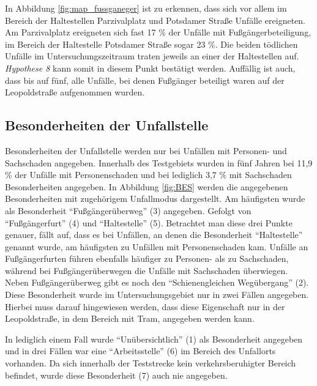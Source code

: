 In Abbildung \ref{fig:map_fussganeger} ist zu erkennen, dass sich vor allem im Bereich der Haltestellen Parzivalplatz und Potsdamer Straße Unfälle ereigneten. Am Parzivalplatz ereigneten sich fast 17 \% der Unfälle mit Fußgängerbeteiligung, im Bereich der Haltestelle Potsdamer Straße sogar 23 \%. Die beiden tödlichen Unfälle im Untersuchungszeitraum traten jeweils an einer der Haltestellen auf. \textit{Hypothese 8} kann somit in diesem Punkt bestätigt werden. Auffällig ist auch, dass bis auf fünf, alle Unfälle, bei denen Fußgänger beteiligt waren auf der Leopoldstraße aufgenommen wurden.

\subsection{Besonderheiten der Unfallstelle}
Besonderheiten der Unfallstelle werden nur bei Unfällen mit Personen- und Sachschaden angegeben. Innerhalb des Testgebiets wurden in fünf Jahren bei 11,9 \% der Unfälle mit Personenschaden und bei lediglich 3,7 \% mit Sachschaden Besonderheiten angegeben. In Abbildung \ref{fig:BES} werden die angegebenen Besonderheiten mit zugehörigem Unfallmodus dargestellt. Am häufigsten wurde als Besonderheit \enquote{Fußgängerüberweg} (3) angegeben. Gefolgt von \enquote{Fußgängerfurt} (4) und \enquote{Haltestelle} (5). Betrachtet man diese drei Punkte genauer, fällt auf, dass es bei Unfällen, an denen die Besonderheit \enquote{Haltestelle} genannt wurde, am häufigsten zu Unfällen mit Personenschaden kam. Unfälle an Fußgängerfurten führen ebenfalls häufiger zu Personen- als zu Sachschaden, während bei Fußgängerüberwegen die Unfälle mit Sachschaden überwiegen. Neben Fußgängerüberweg gibt es noch den \enquote{Schienengleichen Wegübergang} (2). Diese Besonderheit wurde im Untersuchungsgebiet nur in zwei Fällen angegeben. Hierbei muss darauf hingewiesen werden, dass diese Eigenschaft nur in der Leopoldstraße, in dem Bereich mit Tram, angegeben werden kann.

In lediglich einem Fall wurde \enquote{Unübersichtlich} (1) als Besonderheit angegeben und in drei Fällen war eine \enquote{Arbeitsstelle} (6) im Bereich des Unfallorts vorhanden. Da sich innerhalb der Teststrecke kein verkehrsberuhigter Bereich befindet, wurde diese Besonderheit (7) auch nie angegeben. 

